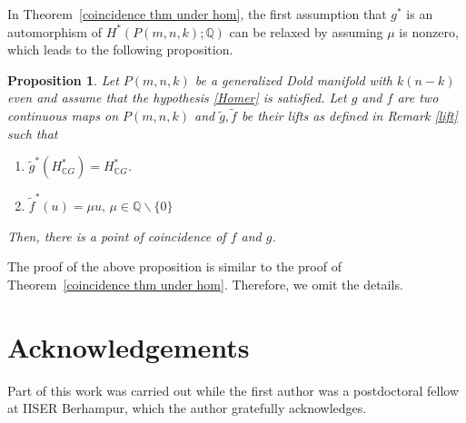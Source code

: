 \documentclass{amsart}
\newtheorem{proposition}[theorem]{Proposition}
\newcommand{\thmref}[1]{Theorem~\ref{#1}}
\begin{document}
In \thmref{coincidence thm under hom}, the first assumption that $g^*$ is an automorphism %
of $H^*(P(m,n,k); \mathbb{Q})$ can %
be relaxed by assuming $\mu$ is nonzero, which leads %
to the following proposition. 
\begin{proposition}
	Let %
$P(m,n,k)$ be a generalized Dold manifold with $k(n-k)$ even and assume that the hypothesis \eqref{Homer} is satisfied. Let $g$ and $f$ are two continuous maps on $P(m,n,k)$ and $\tilde g, \tilde f$ be their lifts as defined in  Remark \ref{lift} such %
that
	\begin{enumerate}
		\item $\tilde g^*(H^*_{\mathbb CG})= H^*_{\mathbb CG}$.
		\item $\tilde f^*(u)=\mu u,\, \mu\in \mathbb Q\backslash \{0\}$ %
	\end{enumerate}
Then, there is a point of coincidence of $f$ and  $g$.
\end{proposition}
The proof of the above proposition is similar to the proof of \thmref{coincidence thm under hom}. Therefore, we omit the %
details.

\section*{Acknowledgements}
Part %
of this work was carried out while the first author was a postdoctoral fellow at IISER Berhampur, which the author gratefully acknowledges.
\end{document}
